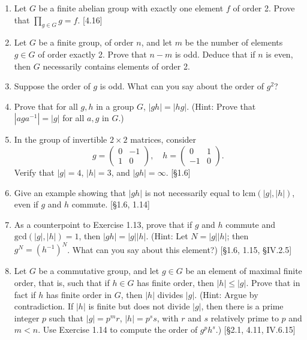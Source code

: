 \begin{enumerate}
    \item Let $G$ be a finite abelian group with exactly one element $f$ of order 2. Prove that $\prod_{g \in G} g = f$. [4.16]

    \item Let $G$ be a finite group, of order $n$, and let $m$ be the number of elements $g \in G$ of order exactly 2. Prove that $n-m$ is odd. Deduce that if $n$ is even, then $G$ necessarily contains elements of order 2.

    \item Suppose the order of $g$ is odd. What can you say about the order of $g^2$?

    \item Prove that for all $g, h$ in a group $G$, $|gh| = |hg|$. (Hint: Prove that $|aga^{-1}| = |g|$ for all $a, g$ in $G$.)

    \item In the group of invertible $2 \times 2$ matrices, consider
          \[
              g = \begin{pmatrix} 0 & -1 \\ 1 & 0 \end{pmatrix}, \quad h = \begin{pmatrix} 0 & 1 \\ -1 & 0 \end{pmatrix}.
          \]
          Verify that $|g|=4$, $|h|=3$, and $|gh|=\infty$. [\S1.6]

    \item Give an example showing that $|gh|$ is not necessarily equal to $\text{lcm}(|g|,|h|)$, even if $g$ and $h$ commute. [\S1.6, 1.14]

    \item As a counterpoint to Exercise 1.13, prove that if $g$ and $h$ commute and $\text{gcd}(|g|, |h|) = 1$, then $|gh| = |g||h|$. (Hint: Let $N = |g||h|$; then $g^N = (h^{-1})^N$. What can you say about this element?) [\S1.6, 1.15, \S IV.2.5]

    \item Let $G$ be a commutative group, and let $g \in G$ be an element of maximal finite order, that is, such that if $h \in G$ has finite order, then $|h| \le |g|$. Prove that in fact if $h$ has finite order in $G$, then $|h|$ divides $|g|$. (Hint: Argue by contradiction. If $|h|$ is finite but does not divide $|g|$, then there is a prime integer $p$ such that $|g| = p^m r$, $|h| = p^s s$, with $r$ and $s$ relatively prime to $p$ and $m < n$. Use Exercise 1.14 to compute the order of $g^p h^s$.) [\S2.1, 4.11, IV.6.15]
\end{enumerate}